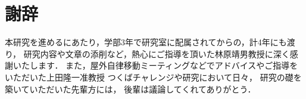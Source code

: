 \chapter*{謝辞}

本研究を進めるにあたり，学部3年で研究室に配属されてからの，計4年にも渡り，
研究内容や文章の添削など，熱心にご指導を頂いた林原靖男教授に深く感謝いたします．
また，屋外自律移動ミーティングなどでアドバイスやご指導をいただいた上田隆一准教授
つくばチャレンジや研究において日々，
研究の礎を築いていただいた先輩方には，
後輩は議論してくれてありがとう．

%
